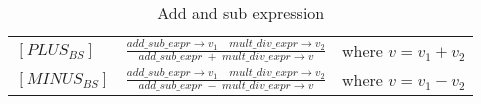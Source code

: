    \bgroup
    \def\arraystretch{3}
    \begin{table}[H]
    \centering
    \begin{tabular}{l c l}
        
        $[PLUS_{BS}]$ &$\frac{add\_sub\_expr \rightarrow v_1 \quad mult\_div\_expr \rightarrow v_2}{add\_sub\_expr\;+\;mult\_div\_expr \rightarrow v}$ & where $v = v_1 + v_2$ \\
        
        $[MINUS_{BS}]$ &$\frac{add\_sub\_expr \rightarrow v_1 \quad mult\_div\_expr \rightarrow v_2}{add\_sub\_expr\;-\;mult\_div\_expr \rightarrow v}$ & where $v = v_1 - v_2$ \\
        
    \end{tabular}
    \caption{Add and sub expression}
    \label{tab:addSubExpr}
    \end{table}
    \egroup
